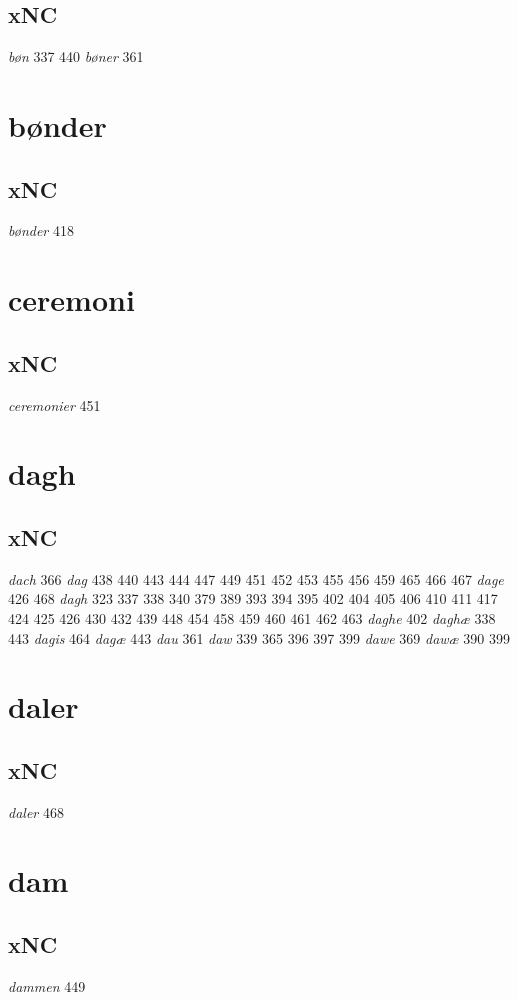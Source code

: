 \documentclass[a4paper,twocolumn]{article}
\begin{document}
\subsection{xNC}
\label{sec:orge3ef6fa}
\emph{bøn} 337 440 \emph{bøner} 361 
\section{bønder}
\label{sec:org402adee}
\subsection{xNC}
\label{sec:org25dca01}
\emph{bønder} 418 
\section{ceremoni}
\label{sec:org55f8791}
\subsection{xNC}
\label{sec:org4fde242}
\emph{ceremonier} 451 
\section{dagh}
\label{sec:org9e8f269}
\subsection{xNC}
\label{sec:org4a53b3e}
\emph{dach} 366 \emph{dag} 438 440 443 444 447 449 451 452 453 455 456 459 465 466 467 \emph{dage} 426 468 \emph{dagh} 323 337 338 340 379 389 393 394 395 402 404 405 406 410 411 417 424 425 426 430 432 439 448 454 458 459 460 461 462 463 \emph{daghe} 402 \emph{daghæ} 338 443 \emph{dagis} 464 \emph{dagæ} 443 \emph{dau} 361 \emph{daw} 339 365 396 397 399 \emph{dawe} 369 \emph{dawæ} 390 399 
\section{daler}
\label{sec:org0b660b3}
\subsection{xNC}
\label{sec:orgba0e816}
\emph{daler} 468 
\section{dam}
\label{sec:org3aee331}
\subsection{xNC}
\label{sec:orgee3487b}
\emph{dammen} 449 
\end{document}

